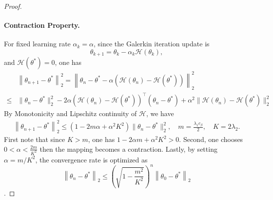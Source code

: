 \documentclass[12pt]{article}
\def\lam{\lambda}
\def\th{\theta}
\def\th{\theta}
\def\l{\left}
\def\r{\right}
\def\ll{\left\lVert}
\def\rl{\right\rVert}
\begin{document}
\begin{proof}
\paragraph{Contraction Property.}
For fixed learning rate $\alpha_k = \alpha$, since the Galerkin iteration update is
\[
\theta_{k+1} = \theta_k - \alpha_k \mathcal{H}(\theta_k),
\]
and $\mathcal{H}(\th^*) = 0$, one has
\[
\begin{aligned}
&\ll \th_{n+1} - \th^* \rl_2^2 = \ll \th_n -\th^* - \alpha (\mathcal{H}(\th_n) -  \mathcal{H}(\th^*)) \rl_2^2 \\
\leq&     \|\theta_n - \th^*\|_2^2 - 2\alpha  (\mathcal{H}(\theta_n) - \mathcal{H}(\th^*))^\top (\theta_n - \th^*)+ \alpha^2 \|\mathcal{H}(\theta_n) - \mathcal{H}(\th^*)\|_2^2
\end{aligned}
\]
By Monotonicity and Lipschitz continuity of $\mathcal H$, we have
\begin{align*}
\ll \th_{n+1} - \th^* \rl_2^2\leq (1 - 2m\alpha + \alpha^2 K^2) \|\theta_n - \th^*\|_2^2,\quad m = \frac{\lam_1c_\beta}{2}, \quad K = 2\lam_2.
\end{align*}
First note that since $K>m$, one has $1 - 2\alpha m+ \alpha^2 K^2 > 0$. Second, one chooses $0< \alpha < \frac{2m}{K^2}$ then the mapping becomes a contraction. Lastly, by setting $\alpha = m/K^2$, the convergence rate is optimized as 
\[
\ll \th_n - \th^* \rl_2 \leq \l(\sqrt{1-\frac{m^2}{K^2}}\r)^n \ll\th_0 - \th^* \rl_2 
\]. 
\end{proof}
\fi
\end{document}
